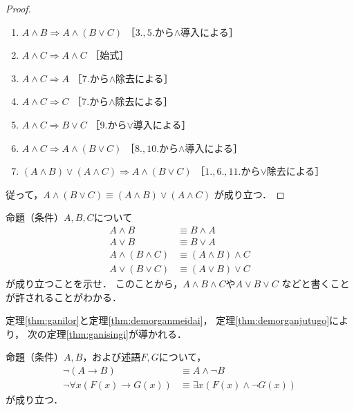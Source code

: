 \begin{proof}
\begin{enumerate}[1. ]
       \item $A \land B \Longrightarrow A \land ( B \lor C)$
              \quad ［$3., 5.$から$\land$導入による］
       \item $A \land C \Longrightarrow A \land C$ \quad ［始式］
       \item $A \land C \Longrightarrow A$ \quad ［7.から$\land$除去による］
       \item $A \land C \Longrightarrow C$ \quad ［7.から$\land$除去による］
       \item $A \land C \Longrightarrow B \lor C$ \quad ［9.から$\lor$導入による］
       \item $A \land C \Longrightarrow A \land ( B \lor C )$
              \quad ［$8., 10.$から$\land$導入による］
       \item $(A \land B) \lor ( A \land C) \Longrightarrow A \land (B \lor C)$
              \quad ［$1., 6., 11.$から$\lor$除去による］
     \end{enumerate}
     従って，$A \land (B \lor C) \equiv (A \land B) \lor (A \land C)$
     が成り立つ．
   \end{proof}
   \begin{que} \label{que:meidaiketugouritu}
     命題（条件）$A,  B,  C$について
     \begin{align}
       A \land B & \equiv B \land A
       \label{eq:landkoukan} \\
       A \lor B & \equiv B \lor A 
       \label{eq:lorkoukan} \\
       A \land ( B \land C) & \equiv (A \land B ) \land C 
       \label{eq:landketugouritu} \\
       A \lor ( B \lor C) & \equiv ( A \lor B ) \lor C
       \label{eq:lorketugouritu}
     \end{align}
     が成り立つことを示せ．
     このことから，$A \land B \land C$や$A \lor B \lor C$
     などと書くことが許されることがわかる．
   \end{que}
   定理\ref{thm:ganilor}と定理\ref{thm:demorganmeidai}，
   定理\ref{thm:demorganjutugo}により，
   次の定理\ref{thm:ganisingi}が導かれる．
   \begin{thm} \label{thm:ganisingi}
     命題（条件）$A,  B$，および述語$F,  G$について，
     \begin{align}
       \lnot ( A \to B ) & \equiv A \land \lnot B
       \label{eq:ganisingi} \\
       \lnot \forall x ( F(x) \to G(x) ) 
       & \equiv \exists x ( F(x) \land \lnot G(x) )
       \label{eq:ganisingijutugo}
     \end{align}
     が成り立つ．
   \end{thm}
